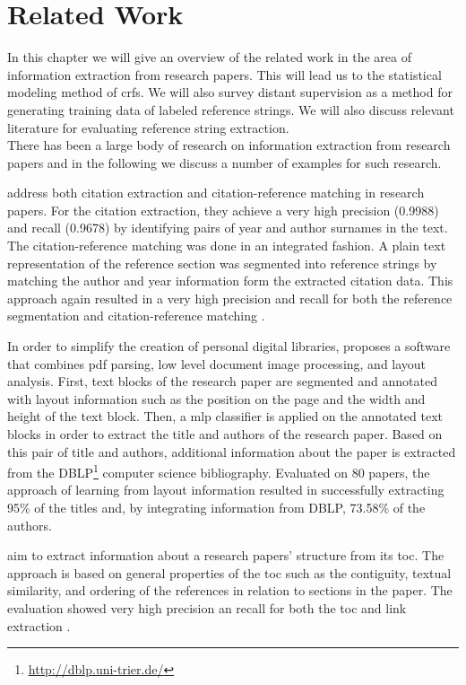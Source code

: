\chapter{Related Work}\label{cha:related-work}
In this chapter we will give an overview of the related work in the area of information extraction from research papers. This will lead us to the statistical modeling method of \glspl{crf}. We will also survey distant supervision as a method for generating training data of labeled reference strings. We will also discuss relevant literature for evaluating reference string extraction.\\

There has been a large body of research on information extraction from research papers and in the following we discuss a number of examples for such research.

\citet{powley2007evidence} address both citation extraction and citation-reference matching in research papers. For the citation extraction, they achieve a very high precision (0.9988) and recall (0.9678) by identifying pairs of year and author surnames in the text. The citation-reference matching was done in an integrated fashion. A plain text representation of the reference section was segmented into reference strings by matching the author and year information form the extracted citation data. This approach again resulted in a very high precision and recall for both the reference segmentation and citation-reference matching \citep{powley2007evidence}.

In order to simplify the creation of personal digital libraries, \citet{marinai2009metadata} proposes a software that combines \gls{pdf} parsing, low level document image processing, and layout analysis. First, text blocks of the research paper are segmented and annotated with layout information such as the position on the page and the width and height of the text block. Then, a \gls{mlp} classifier is applied on the annotated text blocks in order to extract the title and authors of the research paper. Based on this pair of title and authors, additional information about the paper is extracted from the DBLP\footnote{\url{http://dblp.uni-trier.de/}} computer science bibliography. Evaluated on 80 papers, the approach of learning from layout information resulted in successfully extracting 95\% of the titles and, by integrating information from DBLP, 73.58\% of the authors.

\citet{dejean2005structuring} aim to extract information about a research papers' structure from its \gls{toc}. The approach is based on general properties of the \gls{toc} such as the contiguity, textual similarity, and ordering of the references in relation to sections in the paper. The evaluation showed very high precision an recall for both the \gls{toc} and link extraction \citep{dejean2005structuring}.

